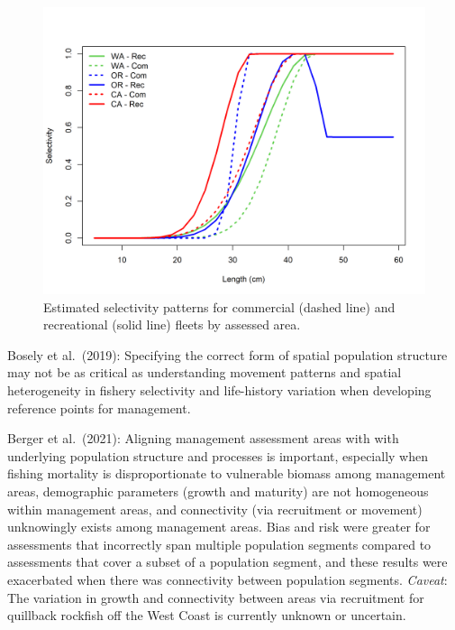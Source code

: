 \documentclass[11pt,
  english,
  letterpaper,
]{article}
\begin{document}
\begin{figure}
\centering
\includegraphics[width=1\textwidth,height=1\textheight]{comprare_selectivity.png}
\caption{Estimated selectivity patterns for commercial (dashed line) and recreational (solid line) fleets by assessed area.\label{fig:selectivity-comparison}}
\end{figure}

\tagmcend\tagstructend

\clearpage


Bosely et al.~{(2019)\leavevmode\tagmcend\tagstructend}: Specifying the correct form of spatial population structure may not be as critical as understanding movement patterns and spatial heterogeneity in fishery selectivity and life-history variation when developing reference points for management.

\leavevmode\tagmcend\tagstructend\par


Berger et al.~{(2021)\leavevmode\tagmcend\tagstructend}: Aligning management assessment areas with with underlying population structure and processes is important, especially when fishing mortality is disproportionate to vulnerable biomass among management areas, demographic parameters (growth and maturity) are not homogeneous within management areas, and connectivity (via recruitment or movement) unknowingly exists among management areas. Bias and risk were greater for assessments that incorrectly span multiple population segments compared to assessments that cover a subset of a population segment, and these results were exacerbated when there was connectivity between population segments. \emph{Caveat}: The variation in growth and connectivity between areas via recruitment for quillback rockfish off the West Coast is currently unknown or uncertain.
\end{document}
